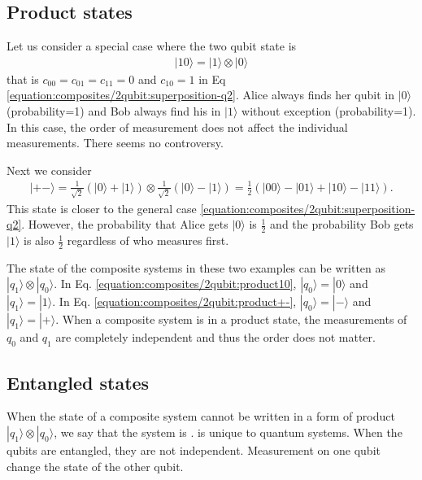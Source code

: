 \documentclass[letterpaper,10pt,english]{jupyterBook}
\begin{document}
\subsection{Product states}
\label{\detokenize{composites/2qubit:product-states}}
\sphinxAtStartPar
Let us consider a special case where the two qubit state is
\begin{equation}\label{equation:composites/2qubit:product10}
\begin{split}
|10\rangle = |1\rangle \otimes |0\rangle
\end{split}
\end{equation}
\sphinxAtStartPar
that is \(c_{00}=c_{01}=c_{11}=0\) and \(c_{10}=1\) in Eq \eqref{equation:composites/2qubit:superposition-q2}.  Alice always finds her qubit in \(|0\rangle\) (probability=1) and Bob always find his in \(|1\rangle\) without exception (probability=1).   In this case, the order of measurement does not affect the individual measurements. There seems no controversy.

\sphinxAtStartPar
Next we consider
\begin{equation}\label{equation:composites/2qubit:product+-}
\begin{split}
|+-\rangle = \frac{1}{\sqrt{2}} \left(|0\rangle + |1\rangle\right ) \otimes \frac{1}{\sqrt{2}} \left(|0\rangle - |1\rangle\right ) = \frac{1}{2} \left(|00\rangle - |01\rangle + |10\rangle - |11\rangle \right).
\end{split}
\end{equation}
\sphinxAtStartPar
This state is closer to the general case \eqref{equation:composites/2qubit:superposition-q2}.  However, the probability that Alice gets \(|0\rangle\) is \(\frac{1}{2}\) and the probability Bob gets \(|1\rangle\) is also \(\frac{1}{2}\) regardless of who measures first.

\sphinxAtStartPar
The state of the composite systems in these two examples can be written as  \(|q_1\rangle \otimes |q_0\rangle\).  In Eq. \eqref{equation:composites/2qubit:product10}, \(|q_0\rangle = |0\rangle\) and \(|q_1\rangle = |1\rangle\).  In Eq. \eqref{equation:composites/2qubit:product+-}, \(|q_0\rangle = |-\rangle\) and \(|q_1\rangle = |+\rangle\).  When a composite system is in a product state, the measurements of \(q_0\) and \(q_1\) are completely independent and thus the order does not matter.


\subsection{Entangled states}
\label{\detokenize{composites/2qubit:entangled-states}}
\sphinxAtStartPar
When the state of a composite system cannot be written in a form of product \(|q_1\rangle \otimes |q_0\rangle\), we say that the system is .   is unique to quantum systems.
When the qubits are entangled, they are not independent. Measurement on one qubit change the state of the other qubit.
\end{document}
